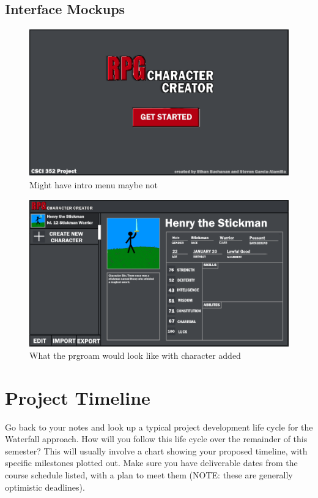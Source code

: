 \documentclass[10pt,conference,onecolumn,compsoc]{IEEEtran}
\begin{document}
\subsection{Interface Mockups}

\begin{figure}[H]
\includegraphics[height=240px, width=426px]{CSCI 352 Interface Mockups/Interface Mockup 0.png}
\caption{Might have intro menu maybe not}
\centering
\end{figure}

\begin{figure}[H]
\includegraphics[height=240px, width=426px]{CSCI 352 Interface Mockups/Interface Mockup 1.png}
\caption{What the prgroam would look like with character added}
\centering
\end{figure}

\section{Project Timeline}
Go back to your notes and look up a typical project development life cycle for the Waterfall approach.  How will you follow this life cycle over the remainder of this semester?  This will usually involve a chart showing your proposed timeline, with specific milestones plotted out.  Make sure you have deliverable dates from the course schedule listed, with a plan to meet them (NOTE: these are generally optimistic deadlines).
\end{document}
